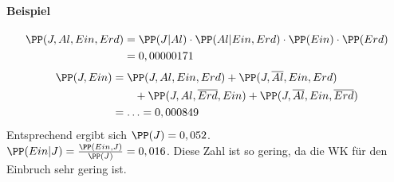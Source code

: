 \paragraph{Beispiel} 
\begin{align*}
\PP(J, Al, Ein, Erd) &= \PP(J|Al) \cdot \PP(Al|Ein, Erd) \cdot \PP(Ein) \cdot \PP(Erd)\\
&= 0,00000171
\end{align*}
\begin{align*}
\PP(J, Ein) &= \PP(J, Al, Ein, Erd) + \PP(J, \overline{Al}, Ein, Erd)\\
& \qquad +\PP(J, Al, \overline{Erd}, Ein) + \PP(J, \overline{Al}, Ein, \overline{Erd})\\
&= \ldots = 0,000849
\end{align*}
Entsprechend ergibt sich $\PP(J) = 0,052$.\\
$\PP(Ein|J) = \frac{\PP(Ein, J)}{\PP(J)}=0,016$. Diese Zahl ist so gering, da die WK für den Einbruch sehr gering ist.



